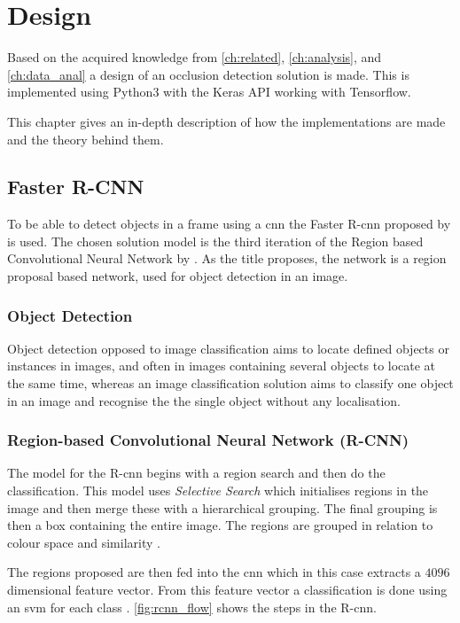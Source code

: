 \graphicspath{{figures/design/}}
\chapter{Design}\label{ch:design}
Based on the acquired knowledge from \autoref{ch:related}, \autoref{ch:analysis}, and \autoref{ch:data_anal} a design of an occlusion detection solution is made. This is implemented using Python3 with the Keras API working with Tensorflow.

This chapter gives an in-depth description of how the implementations are made and the theory behind them.
\section{Faster R-CNN}
To be able to detect objects in a frame using a \gls{cnn} the Faster R-\gls{cnn} proposed by \cite{Ren2017} is used. The chosen solution model is the third iteration of the Region based Convolutional Neural Network by \cite{Girshick2014}. As the title proposes, the network is a region proposal based network, used for object detection in an image.

\subsection{Object Detection}
Object detection opposed to image classification aims to locate defined objects or instances in images, and often in images containing several objects to locate at the same time, whereas an image classification solution aims to classify one object in an image and recognise the the single object without any localisation.

\subsection{Region-based Convolutional Neural Network (R-CNN)} 
The model for the R-\gls{cnn} begins with a region search and then do the classification. This model uses \textit{Selective Search} which initialises regions in the image and then merge these with a hierarchical grouping. The final grouping is then a box containing the entire image. The regions are grouped in relation to colour space and similarity \citep{Girshick2014}.

The regions proposed are then fed into the \gls{cnn} which in this case extracts a $4096$ dimensional feature vector. From this feature vector a classification is done using an \gls{svm} for each class \citep{Girshick2014}. \autoref{fig:rcnn_flow} shows the steps in the R-\gls{cnn}.

